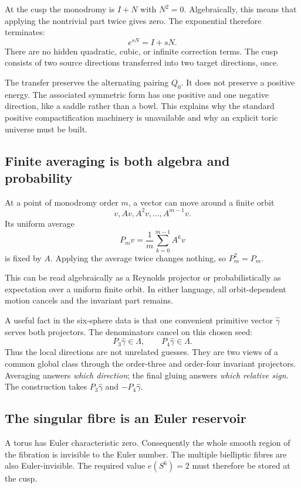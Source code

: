 \documentclass[11pt,reqno]{amsart}
\numberwithin{equation}{section}
\newcommand{\wideg}{\widehat\gamma}
\theoremstyle{definition}
\begin{document}
At the cusp the monodromy is $I+N$ with $N^2=0$. Algebraically, this means that applying the nontrivial part twice gives zero. The exponential therefore terminates:
\[
e^{sN}=I+sN.
\]
There are no hidden quadratic, cubic, or infinite correction terms. The cusp consists of two source directions transferred into two target directions, once.

The transfer preserves the alternating pairing $Q_0$. It does not preserve a positive energy. The associated symmetric form has one positive and one negative direction, like a saddle rather than a bowl. This explains why the standard positive compactification machinery is unavailable and why an explicit toric universe must be built.

\subsection{Finite averaging is both algebra and probability}

At a point of monodromy order $m$, a vector can move around a finite orbit
\[
v,Av,A^2v,\ldots,A^{m-1}v.
\]
Its uniform average
\[
P_mv=\frac1m\sum_{k=0}^{m-1}A^kv
\]
is fixed by $A$. Applying the average twice changes nothing, so $P_m^2=P_m$.

This can be read algebraically as a Reynolds projector or probabilistically as expectation over a uniform finite orbit. In either language, all orbit-dependent motion cancels and the invariant part remains.

A useful fact in the six-sphere data is that one convenient primitive vector $\wideg$ serves both projectors. The denominators cancel on this chosen seed:
\[
P_3\wideg\in\Lambda,
\qquad
P_4\wideg\in\Lambda.
\]
Thus the local directions are not unrelated guesses. They are two views of a common global class through the order-three and order-four invariant projectors. Averaging answers \emph{which direction}; the final gluing answers \emph{which relative sign}. The construction takes $P_3\wideg$ and $-P_4\wideg$.

\subsection{The singular fibre is an Euler reservoir}

A torus has Euler characteristic zero. Consequently the whole smooth region of the fibration is invisible to the Euler number. The multiple bielliptic fibres are also Euler-invisible. The required value $e(S^6)=2$ must therefore be stored at the cusp.
\end{document}
